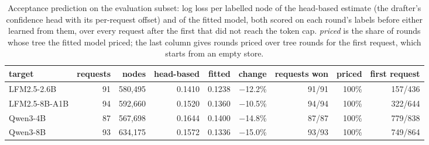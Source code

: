 \begin{table}[t]
\centering\small
\caption{Acceptance prediction on the evaluation subset: log loss per labelled node of the head-based estimate (the drafter's confidence head with its per-request offset) and of the fitted model, both scored on each round's labels before either learned from them, over every request after the first that did not reach the token cap. \emph{priced} is the share of rounds whose tree the fitted model priced; the last column gives rounds priced over tree rounds for the first request, which starts from an empty store.}
\label{tab:accept}
\setlength{\tabcolsep}{4pt}
\begin{tabular}{lrrrrrrrr}
\toprule
\rowcolor{head}\textbf{target} & \textbf{requests} & \textbf{nodes} & \textbf{head-based} & \textbf{fitted} & \textbf{change} & \textbf{requests won} & \textbf{priced} & \textbf{first request} \\
\midrule
LFM2.5-2.6B & 91 & 580,495 & 0.1410 & 0.1238 & $-$12.2\% & 91/91 & 100\% & 157/436 \\
LFM2.5-8B-A1B & 94 & 592,660 & 0.1520 & 0.1360 & $-$10.5\% & 94/94 & 100\% & 322/644 \\
Qwen3-4B & 87 & 567,698 & 0.1644 & 0.1400 & $-$14.8\% & 87/87 & 100\% & 779/838 \\
Qwen3-8B & 93 & 634,175 & 0.1572 & 0.1336 & $-$15.0\% & 93/93 & 100\% & 749/864 \\
\bottomrule
\end{tabular}
\end{table}
